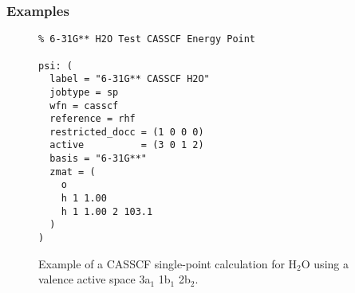 \subsubsection{Examples}
\begin{figure}[h!]
\begin{verbatim}
% 6-31G** H2O Test CASSCF Energy Point
                                                                                
psi: (
  label = "6-31G** CASSCF H2O"
  jobtype = sp
  wfn = casscf
  reference = rhf
  restricted_docc = (1 0 0 0)
  active          = (3 0 1 2)
  basis = "6-31G**"
  zmat = (
    o
    h 1 1.00
    h 1 1.00 2 103.1
  )
)
\end{verbatim}
\caption{Example of a CASSCF single-point calculation for H$_2$O using
  a valence active space 3a$_1$ 1b$_1$ 2b$_2$.}
\label{ex:casscf-sp-1}
\end{figure}

